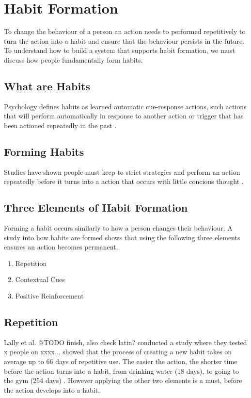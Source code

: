 \newpage

\section{Habit Formation}
To change the behaviour of a person an action needs to performed repetitively to turn the action into a habit and ensure that the behaviour persists in the future.\newline
To understand how to build a system that supports habit formation, we must discuss how people fundamentally form habits.

\subsection{What are Habits}
Psychology defines habits as learned automatic cue-response actions, such actions that will perform automatically in response to another action or trigger that has been actioned repeatedly in the past \cite{article_the_habitual_consumer}.

\subsection{Forming Habits}
Studies have shown people must keep to strict strategies and perform an action repeatedly before it turns into a action that occurs with little concious thought \cite{article_promoting_habit_formation}.

\subsection{Three Elements of Habit Formation}
Forming a habit occurs similarly to how a person changes their behaviour. A study \cite{article_experiences_of_habit_formation} into how habits are formed shows that using the following three elements ensures an action becomes permanent.

\begin{enumerate}
  \item Repetition
  \item Contextual Cues
  \item Positive Reinforcement
\end{enumerate}

\subsection*{Repetition}
Lally et al. @TODO finish, also check latin? \cite{article_how_habits_formed_modelling_habit_formation} conducted a study where they tested x people on xxxx... showed that the process of creating a new habit takes on average up to 66 days of repetitive use. The easier the action, the shorter time before the action turns into a habit, from drinking water (18 days), to going to the gym (254 days) \cite{article_how_habits_formed_modelling_habit_formation}. However applying the other two elements is a must, before the action develops into a habit.

